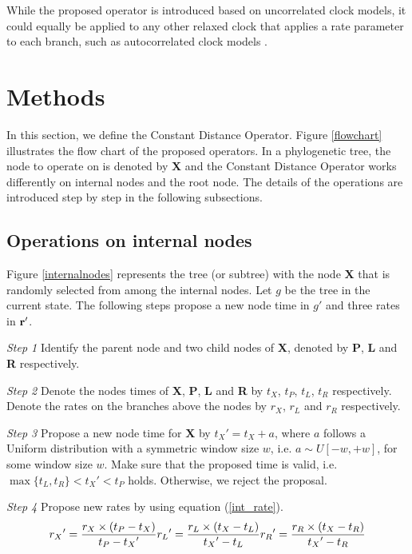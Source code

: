 \documentclass{bmcart}
\begin{document}
While the proposed operator is introduced based on uncorrelated clock models, it could equally be applied to any other relaxed clock that applies a rate parameter to each branch, such as autocorrelated clock models \cite{thorne1998estimating}.

\section*{Methods}
In this section, we define the Constant Distance Operator. Figure \ref{flowchart} illustrates the flow chart of the proposed operators. In a phylogenetic tree, the node to operate on is denoted by \textbf{X} and the Constant Distance Operator works differently on internal nodes and the root node. The details of the operations are introduced step by step in the following subsections.
\subsection*{Operations on internal nodes}
Figure \ref{internalnodes} represents the tree (or subtree) with the node \textbf{X} that is randomly selected from among the internal nodes. Let $g$ be the tree in the current state. The following steps propose a new node time in ${g}'$ and three rates in $\bf{r}'$.

\emph{Step 1} Identify the parent node and two child nodes of \textbf{X}, denoted by \textbf{P}, \textbf{L} and \textbf{R} respectively.

\emph{Step 2} Denote the nodes times of \textbf{X}, \textbf{P}, \textbf{L} and \textbf{R} by $t_X$, $t_P$, $t_L$, $t_R$ respectively. Denote the rates on the branches above the nodes by $r_X$, $r_L$ and $r_R$ respectively.

\emph{Step 3} Propose a new node time for \textbf{X} by ${t_X}' = {t_X} + a$, where $a$ follows a Uniform distribution with a symmetric window size $w$, i.e. $a \sim U[ - w, + w]$, for some window size $w$. Make sure that the proposed time is valid, i.e. $\max \{ {t_L},{t_R}\}  < {t_X}' < {t_P}$ holds. Otherwise, we reject the proposal.

\emph{Step 4} Propose new rates by using equation (\ref{int_rate}).
\begin{equation}
 \label{int_rate}
{r_X}' = \frac{{r_X} \times ({{t_P} - {t_X}})}{{{t_P} - {t_X}'}}\\
{r_L}' = \frac{{{r_L} \times ({{t_X} - {t_L}})}}{{{t_X}' - {t_L}}}\\
{r_R}' = \frac{{{r_R} \times ({{t_X} - {t_R}})}}{{{t_X}' - {t_R}}}
 \end{equation}
\end{document}
